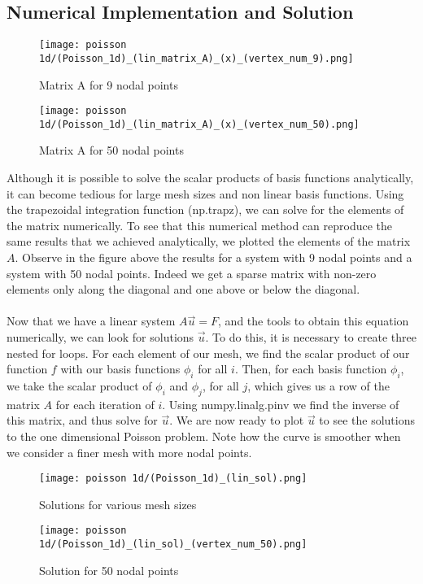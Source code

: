 \documentclass{article}
\begin{document}
\subsection{Numerical Implementation and Solution}
\begin{figure}[hbt!]
\centering
\begin{minipage}{.5\textwidth}
    \centering
    \texttt{[image: poisson 1d/(Poisson\_1d)\_(lin\_matrix\_A)\_(x)\_(vertex\_num\_9).png]}
    \caption{Matrix A for 9 nodal points}
    \label{fig:Matrix A for 9 nodal points}

\end{minipage}%
\begin{minipage}{.5\textwidth}
    \centering
    \texttt{[image: poisson 1d/(Poisson\_1d)\_(lin\_matrix\_A)\_(x)\_(vertex\_num\_50).png]}
    \caption{Matrix A for 50 nodal points}
    \label{fig:Matrix A for 50 nodal points}

\end{minipage}
\end{figure}
Although it is possible to solve the scalar products of basis functions analytically, it can become tedious for large mesh sizes and non linear basis functions. Using the trapezoidal integration function (np.trapz), we can solve for the elements of the matrix numerically. To see that this numerical method can reproduce the same results that we achieved analytically, we plotted the elements of the matrix $A$. Observe in the figure above the results for a system with 9 nodal points and a system with 50 nodal points. Indeed we get a sparse matrix with non-zero elements only along the diagonal and one above or below the diagonal. 
\\
\\
Now that we have a linear system $A \vec{u} = F$, and the tools to obtain this equation numerically, we can look for solutions $\vec{u}$. To do this, it is necessary to create three nested for loops. For each element of our mesh, we find the scalar product of our function $f$ with our basis functions $\phi_i$ for all $i$. Then, for each basis function $\phi_i$, we take the scalar product of $\phi_i$ and $\phi_j$, for all $j$, which gives us a row of the matrix $A$ for each iteration of $i$. Using numpy.linalg.pinv we find the inverse of this matrix, and thus solve for $\vec{u}$. We are now ready to plot $\vec{u}$ to see the solutions to the one dimensional Poisson problem. Note how the curve is smoother when we consider a finer mesh with more nodal points. 
\begin{figure}[hbt!]
\centering
\begin{minipage}{.5\textwidth}
    \centering
    \texttt{[image: poisson 1d/(Poisson\_1d)\_(lin\_sol).png]}
    \caption{Solutions for various mesh sizes}
    \label{fig:Solution for given nodal points}

\end{minipage}%
\begin{minipage}{.5\textwidth}
    \centering
    \texttt{[image: poisson 1d/(Poisson\_1d)\_(lin\_sol)\_(vertex\_num\_50).png]}
    \caption{Solution for 50 nodal points}
    \label{fig:Solution for 50 nodal points}

\end{minipage}
\end{figure}
\end{document}
